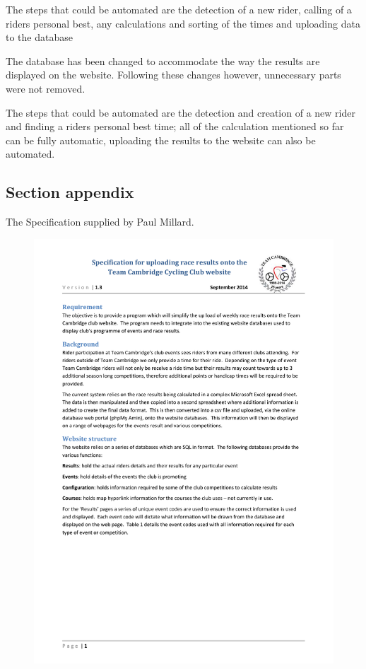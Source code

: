 The steps that could be automated are the detection of a new rider, calling of a riders personal best, any calculations and sorting of the times and uploading data to the database

The database has been changed to accommodate the way the results are displayed on the website. Following these changes  however, unnecessary parts were not removed.

The steps that could be automated are the detection and creation of a new rider and finding a riders personal best time; all of the calculation mentioned so far can be fully automatic, uploading the results to the website can also be automated.



\subsection{Section appendix}


The Specification supplied by Paul Millard.

\begin{figure}[H]
    \includegraphics[width=\textwidth]{./TeamCambridgeSpec/page1.pdf}
\end{figure}

